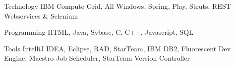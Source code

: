 

\begin{cvskills}

  \cvskill
    {Technology} %
    {IBM Compute Grid, All Windows, Spring, Play, Struts, REST Webservices \& Selenium} %

  \cvskill
    {Programming} %
    {HTML, Java, Sybase, C, C++, Javascript, SQL} %

  \cvskill
    {Tools} %
    {IntelliJ IDEA, Eclipse, RAD, StarTeam, IBM DB2, Fluorescent Dev Engine, Maestro Job Scheduler, StarTeam Version Controller} %

\end{cvskills}
